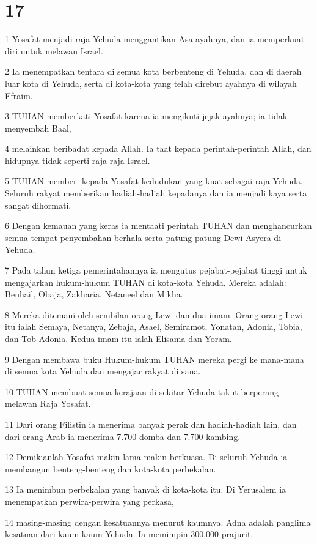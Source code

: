\chapter{17}

\par 1 Yosafat menjadi raja Yehuda menggantikan Asa ayahnya, dan ia memperkuat diri untuk melawan Israel.
\par 2 Ia menempatkan tentara di semua kota berbenteng di Yehuda, dan di daerah luar kota di Yehuda, serta di kota-kota yang telah direbut ayahnya di wilayah Efraim.
\par 3 TUHAN memberkati Yosafat karena ia mengikuti jejak ayahnya; ia tidak menyembah Baal,
\par 4 melainkan beribadat kepada Allah. Ia taat kepada perintah-perintah Allah, dan hidupnya tidak seperti raja-raja Israel.
\par 5 TUHAN memberi kepada Yosafat kedudukan yang kuat sebagai raja Yehuda. Seluruh rakyat memberikan hadiah-hadiah kepadanya dan ia menjadi kaya serta sangat dihormati.
\par 6 Dengan kemauan yang keras ia mentaati perintah TUHAN dan menghancurkan semua tempat penyembahan berhala serta patung-patung Dewi Asyera di Yehuda.
\par 7 Pada tahun ketiga pemerintahannya ia mengutus pejabat-pejabat tinggi untuk mengajarkan hukum-hukum TUHAN di kota-kota Yehuda. Mereka adalah: Benhail, Obaja, Zakharia, Netaneel dan Mikha.
\par 8 Mereka ditemani oleh sembilan orang Lewi dan dua imam. Orang-orang Lewi itu ialah Semaya, Netanya, Zebaja, Asael, Semiramot, Yonatan, Adonia, Tobia, dan Tob-Adonia. Kedua imam itu ialah Elisama dan Yoram.
\par 9 Dengan membawa buku Hukum-hukum TUHAN mereka pergi ke mana-mana di semua kota Yehuda dan mengajar rakyat di sana.
\par 10 TUHAN membuat semua kerajaan di sekitar Yehuda takut berperang melawan Raja Yosafat.
\par 11 Dari orang Filistin ia menerima banyak perak dan hadiah-hadiah lain, dan dari orang Arab ia menerima 7.700 domba dan 7.700 kambing.
\par 12 Demikianlah Yosafat makin lama makin berkuasa. Di seluruh Yehuda ia membangun benteng-benteng dan kota-kota perbekalan.
\par 13 Ia menimbun perbekalan yang banyak di kota-kota itu. Di Yerusalem ia menempatkan perwira-perwira yang perkasa,
\par 14 masing-masing dengan kesatuannya menurut kaumnya. Adna adalah panglima kesatuan dari kaum-kaum Yehuda. Ia memimpin 300.000 prajurit.
